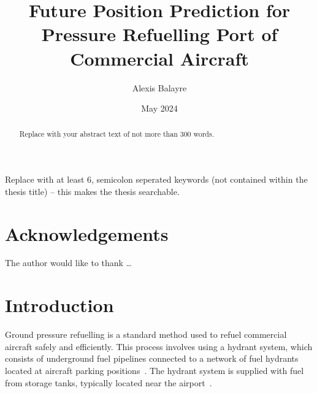 \documentclass[12pt,oneside]{book} %
\title{Future Position Prediction for Pressure Refuelling Port
    of Commercial Aircraft}
\author{Alexis Balayre}
\date{May 2024}
\begin{document}
%
%

\frontmatter

\maketitle

\begin{abstract}
    Replace with your abstract text of not more than 300 words.
\end{abstract}

\begin{keywords}
    Replace with at least 6, semicolon seperated keywords (not contained within the thesis title) – this makes the thesis searchable.
\end{keywords}

\chapter{Acknowledgements}
The author would like to thank \dots

{
    \clearpage

    \singlespacing{
        \tableofcontents
    }
    \clearpage

    \listoffigures

    \clearpage
    \listoftables
}

\begin{listofabbreviations}
\end{listofabbreviations}

%
%
\mainmatter\pagestyle{fancy}
\fancyhead[L]{\nouppercase{\leftmark}}
\fancyhead[R]{\nouppercase{\rightmark}}

\chapter{Introduction}

Ground pressure refuelling is a standard method used to refuel commercial
aircraft safely and efficiently. This process involves using a hydrant system,
which consists of underground fuel pipelines connected to a network of fuel
hydrants located at aircraft parking positions~\cite{blakey2011aviation}. The
hydrant system is supplied with fuel from storage tanks, typically located near
the airport~\cite{kazda2015airport}.
\end{document}
